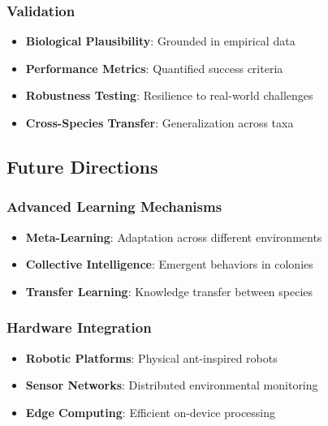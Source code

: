 \documentclass[
  13pt,
  a4paperpaper,
  12pt]{article}
\providecommand{\tightlist}{%
  \setlength{\itemsep}{0pt}\setlength{\parskip}{0pt}}
\begin{document}
\subsubsection{Validation}\label{validation}

\begin{itemize}
\tightlist
\item
  \textbf{Biological Plausibility}: Grounded in empirical data
\item
  \textbf{Performance Metrics}: Quantified success criteria
\item
  \textbf{Robustness Testing}: Resilience to real-world challenges
\item
  \textbf{Cross-Species Transfer}: Generalization across taxa
\end{itemize}

\subsection{Future Directions}\label{future-directions-1}

\subsubsection{Advanced Learning
Mechanisms}\label{advanced-learning-mechanisms}

\begin{itemize}
\tightlist
\item
  \textbf{Meta-Learning}: Adaptation across different environments
\item
  \textbf{Collective Intelligence}: Emergent behaviors in colonies
\item
  \textbf{Transfer Learning}: Knowledge transfer between species
\end{itemize}

\subsubsection{Hardware Integration}\label{hardware-integration}

\begin{itemize}
\tightlist
\item
  \textbf{Robotic Platforms}: Physical ant-inspired robots
\item
  \textbf{Sensor Networks}: Distributed environmental monitoring
\item
  \textbf{Edge Computing}: Efficient on-device processing
\end{itemize}
\end{document}
